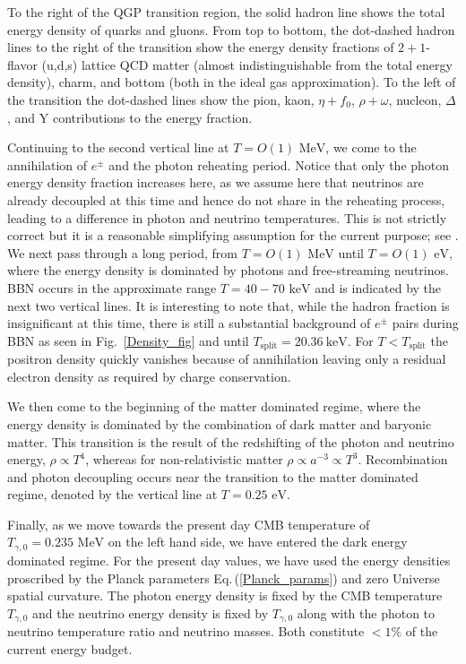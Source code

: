\documentclass[universe,article,submit,moreauthors,pdftex,a4paper]{Definitions/mdpi}
\newcommand{\MeV}{\text{ MeV}}
\newcommand{\keV}{\text{ keV}}
\newcommand{\eV}{\text{ eV}}
\newcommand{\req}[1]{Eq.\,(\ref{#1})}
\newcommand*{\rf}[1]{Fig.~{\ref{#1}}}
\begin{document}
To the right of the QGP transition region, the solid hadron line shows the total energy density of quarks and gluons. From top to bottom, the dot-dashed hadron lines to the right of the transition show the energy density fractions of $2+1$-flavor (u,d,s) lattice QCD matter (almost indistinguishable from the total energy density), charm, and bottom (both in the ideal gas approximation).  To the left of the transition the dot-dashed lines show the  pion, kaon, $\eta+f_0$, $\rho+\omega$, nucleon,  $\Delta$, and Y contributions to the energy fraction.


Continuing to the second vertical line at $T=O(1)\MeV$, we come to the annihilation  of $e^\pm$ and the photon reheating period.  Notice that only the photon energy density fraction increases here, as we assume here that neutrinos are already decoupled at this time and hence do not share in the reheating process, leading to a difference in photon and neutrino temperatures. This is not strictly correct but it is a reasonable simplifying assumption for the current purpose; see \cite{Mangano:2005cc,Fornengo:1997wa,Mangano:2001iu,Birrell:2012gg}.  We next pass through a long period, from $T=O(1)\MeV$ until $T=O(1)\eV$, where the energy density is dominated by photons and free-streaming neutrinos.  BBN occurs in the approximate range $T=40-70\keV$ and is indicated by the next two vertical lines.  It is interesting to note that, while the hadron fraction is insignificant at this time, there is still a substantial background of $e^\pm$ pairs during BBN as seen in \rf{Density_fig} and until $T_{\mathrm{split}} = 20.36\ \mathrm{keV}$. For $T<T_{\mathrm{split}}$ the positron density quickly vanishes because of annihilation leaving only a residual electron density as required by charge conservation. 

 We then come to the beginning of the matter dominated regime, where the energy density is dominated by the combination of dark matter and baryonic matter.  This transition is the result of the redshifting of the photon and neutrino energy, $\rho\propto T^4$, whereas for non-relativistic matter $\rho\propto a^{-3}\propto T^3$.  Recombination and photon decoupling occurs near the transition to the matter dominated regime, denoted by the vertical line at $T=0.25\eV$.

Finally, as we move towards the present day CMB temperature of $T_{\gamma,0}=0.235\MeV$  on the left hand side, we have entered the dark energy dominated regime.  For the present day values, we have used the energy densities proscribed by the Planck parameters \req{Planck_params} \cite{Planck:2013pxb} and zero Universe spatial curvature.  The photon energy density is fixed by the CMB temperature $T_{\gamma,0}$ and the neutrino energy density is fixed by $T_{\gamma,0}$ along with the photon to neutrino temperature ratio and neutrino masses.  Both constitute $<1\%$ of the current energy budget.
\end{document}
